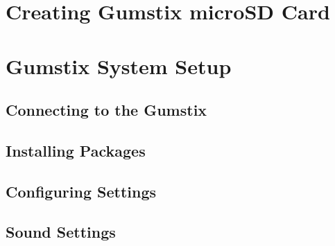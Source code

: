 \section{Creating Gumstix microSD Card}



\section{Gumstix System Setup}

\subsection{Connecting to the Gumstix}

\subsection{Installing Packages}



\subsection{Configuring Settings}



\subsection{Sound Settings}


